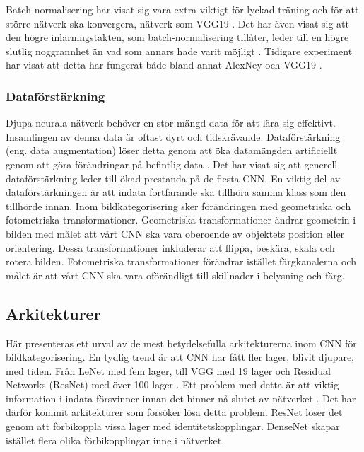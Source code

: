 \documentclass[]{kththesis}
\begin{document}
Batch-normalisering har visat sig vara extra viktigt för lyckad träning och för att större nätverk ska konvergera, nätverk som VGG19 \parencite{simon2016imagenet}. Det har även visat sig att den högre inlärningstakten, som batch-normalisering tillåter, leder till en högre slutlig noggrannhet än vad som annars hade varit möjligt \parencite{simon2016imagenet}. Tidigare experiment har visat att detta har fungerat både bland annat AlexNey och VGG19 \parencite{simon2016imagenet}.

\subsubsection{Dataförstärkning}
Djupa neurala nätverk behöver en stor mängd data för att lära sig effektivt. Insamlingen av denna data är oftast dyrt och tidskrävande. Dataförstärkning (eng. data augmentation) löser detta genom att öka datamängden artificiellt genom att göra förändringar på befintlig data \parencite{taylor2017improving}. Det har visat sig att generell dataförstärkning leder till ökad prestanda på de flesta CNN. En viktig del av dataförstärkningen är att indata fortfarande ska tillhöra samma klass som den tillhörde innan. Inom bildkategorisering sker förändringen med geometriska och fotometriska transformationer. Geometriska transformationer ändrar geometrin i bilden med målet att vårt CNN ska vara oberoende av objektets position eller orientering. Dessa transformationer inkluderar att flippa, beskära, skala och rotera bilden. Fotometriska transformationer förändrar istället färgkanalerna och målet är att vårt CNN ska vara oförändligt till skillnader i belysning och färg. 

\subsection{Arkitekturer}
Här presenteras ett urval av de mest betydelsefulla arkitekturerna inom CNN för bildkategorisering. En tydlig trend är att CNN har fått fler lager, blivit djupare, med tiden. Från LeNet \parencite{lecun1998gradient} med fem lager, till VGG med 19 lager \parencite{simonyan2014very} och Residual Networks (ResNet) med över 100 lager \parencite{he2016deep}. Ett problem med detta är att viktig information i indata försvinner innan det hinner nå slutet av nätverket \parencite{huang2017densely}. Det har därför kommit arkitekturer som försöker lösa detta problem. ResNet löser det genom att förbikoppla vissa lager med identitetskopplingar. DenseNet skapar istället flera olika förbikopplingar inne i nätverket.
\end{document}
